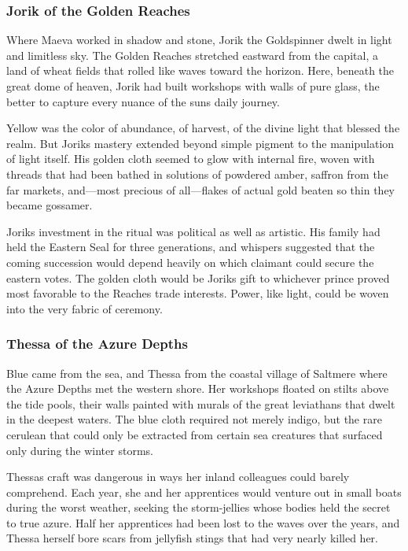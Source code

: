 \subsubsection{Jorik of the Golden
Reaches}\label{jorik-of-the-golden-reaches}

Where Maeva worked in shadow and stone, Jorik the Goldspinner dwelt in
light and limitless sky. The Golden Reaches stretched eastward from the
capital, a land of wheat fields that rolled like waves toward the
horizon. Here, beneath the great dome of heaven, Jorik had built
workshops with walls of pure glass, the better to capture every nuance
of the sun\textquotesingle s daily journey.

Yellow was the color of abundance, of harvest, of the divine light that
blessed the realm. But Jorik\textquotesingle s mastery extended beyond
simple pigment to the manipulation of light itself. His golden cloth
seemed to glow with internal fire, woven with threads that had been
bathed in solutions of powdered amber, saffron from the far markets,
and---most precious of all---flakes of actual gold beaten so thin they
became gossamer.

Jorik\textquotesingle s investment in the ritual was political as well
as artistic. His family had held the Eastern Seal for three generations,
and whispers suggested that the coming succession would depend heavily
on which claimant could secure the eastern votes. The golden cloth would
be Jorik\textquotesingle s gift to whichever prince proved most
favorable to the Reaches\textquotesingle{} trade interests. Power, like
light, could be woven into the very fabric of ceremony.

\subsubsection{Thessa of the Azure
Depths}\label{thessa-of-the-azure-depths}

Blue came from the sea, and Thessa from the coastal village of Saltmere
where the Azure Depths met the western shore. Her workshops floated on
stilts above the tide pools, their walls painted with murals of the
great leviathans that dwelt in the deepest waters. The blue cloth
required not merely indigo, but the rare cerulean that could only be
extracted from certain sea creatures that surfaced only during the
winter storms.

Thessa\textquotesingle s craft was dangerous in ways her inland
colleagues could barely comprehend. Each year, she and her apprentices
would venture out in small boats during the worst weather, seeking the
storm-jellies whose bodies held the secret to true azure. Half her
apprentices had been lost to the waves over the years, and Thessa
herself bore scars from jellyfish stings that had very nearly killed
her.

